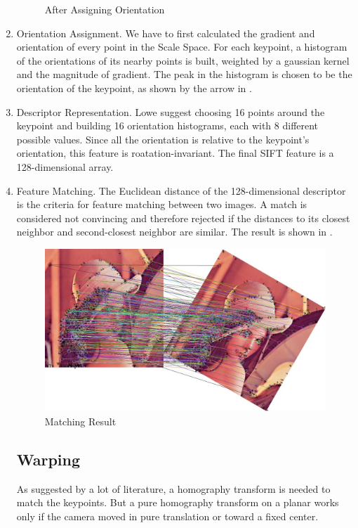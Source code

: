 \begin{enumerate}
\begin{figure}[H]
\begin{minipage}[b]{0.46\linewidth}
        \caption{After Assigning Orientation\label{fig:feature4}}
      \end{minipage}
    \end{figure}

  \item Orientation Assignment.
    We have to first calculated the gradient and orientation of every point in the Scale Space.
    For each keypoint, a histogram of the orientations of its nearby points is built,
    weighted by a gaussian kernel and the magnitude of gradient.
    The peak in the histogram is chosen to be the orientation of the keypoint, as shown by the arrow in .

  \item Descriptor Representation.
    Lowe suggest choosing 16 points around the keypoint and building 16 orientation histograms,
    each with 8 different possible values.
    Since all the orientation is relative to the keypoint's orientation,
    this feature is roatation-invariant. The final SIFT feature is a 128-dimensional array.

  \item Feature Matching.
    The Euclidean distance of the 128-dimensional descriptor is the criteria for feature matching between two images.
    A match is considered not convincing and therefore rejected
    if the distances to its closest neighbor and second-closest neighbor are similar.
    The result is shown in .
    \begin{figure}[H]
      \centering
      \includegraphics[width=\textwidth]{res/match.png}
      \caption{Matching Result\label{fig:match}}
    \end{figure}


    \subsection{Warping}
    As suggested by a lot of literature, a homography transform is needed to match the keypoints.
    But a pure homography transform on a planar works
    only if the camera moved in pure translation or toward a fixed center.


\end{enumerate}
